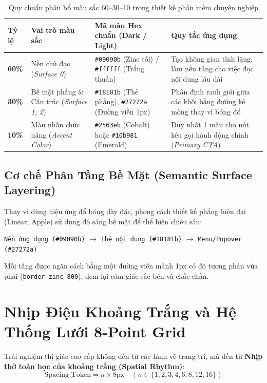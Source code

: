 \documentclass[a4paper,11pt]{article}
\begin{document}
\begin{table}[htbp]
\centering
\small
\caption{Quy chuẩn phân bổ màu sắc 60--30--10 trong thiết kế phần mềm chuyên nghiệp}
\vspace{0.5em}
\begin{tabularx}{\textwidth}{L{2cm} L{3.5cm} L{4.5cm} Y}
\toprule
\textbf{Tỷ lệ} & \textbf{Vai trò màu sắc} & \textbf{Mã màu Hex chuẩn (Dark / Light)} & \textbf{Quy tắc ứng dụng} \\
\midrule
\textbf{60\%} & Nền chủ đạo (\textit{Surface 0}) & \texttt{\#09090b} (Zinc tối) / \texttt{\#ffffff} (Trắng thuần) & Tạo không gian tĩnh lặng, làm nền tảng cho việc đọc nội dung lâu dài \\
\textbf{30\%} & Bề mặt phẳng \& Cấu trúc (\textit{Surface 1, 2}) & \texttt{\#18181b} (Thẻ phẳng), \texttt{\#27272a} (Đường viền 1px) & Phân định ranh giới giữa các khối bằng đường kẻ mỏng thay vì bóng đổ \\
\textbf{10\%} & Màu nhấn chức năng (\textit{Accent Color}) & \texttt{\#2563eb} (Cobalt) hoặc \texttt{\#10b981} (Emerald) & Duy nhất 1 màu cho nút kêu gọi hành động chính (\textit{Primary CTA}) \\
\bottomrule
\end{tabularx}
\end{table}

\subsection{Cơ chế Phân Tầng Bề Mặt (Semantic Surface Layering)}
Thay vì dùng hiệu ứng đổ bóng dày đặc, phong cách thiết kế phẳng hiện đại (Linear, Apple) sử dụng độ sáng bề mặt để thể hiện chiều sâu:
\begin{center}
\texttt{Nền ứng dụng (\#09090b)} $\longrightarrow$ \texttt{Thẻ nội dung (\#18181b)} $\longrightarrow$ \texttt{Menu/Popover (\#27272a)}
\end{center}
Mỗi tầng được ngăn cách bằng một đường viền mảnh 1px có độ tương phản vừa phải (\texttt{border-zinc-800}), đem lại cảm giác sắc bén và chắc chắn.

\section{Nhịp Điệu Khoảng Trắng và Hệ Thống Lưới 8-Point Grid}

Trải nghiệm thị giác cao cấp không đến từ các hình vẽ trang trí, mà đến từ \textbf{Nhịp thở toán học của khoảng trắng (Spatial Rhythm)}:
\begin{equation}
\text{Spacing Token} = n \times 8\text{px} \quad (n \in \{1, 2, 3, 4, 6, 8, 12, 16\})
\end{equation}
\end{document}
